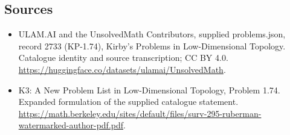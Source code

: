 \documentclass[11pt,a4paper]{article}
\begin{document}
\subsection{Sources}
\begin{itemize}
\item[S1] ULAM.AI and the UnsolvedMath Contributors, supplied problems.json, record 2733 (KP-1.74), Kirby's Problems in Low-Dimensional Topology. Catalogue identity and source transcription; CC BY 4.0.
\url{https://huggingface.co/datasets/ulamai/UnsolvedMath}.
\item[S2] K3: A New Problem List in Low-Dimensional Topology, Problem 1.74. Expanded formulation of the supplied catalogue statement.
\url{https://math.berkeley.edu/sites/default/files/surv-295-ruberman-watermarked-author-pdf.pdf}.
\end{itemize}
\end{document}
